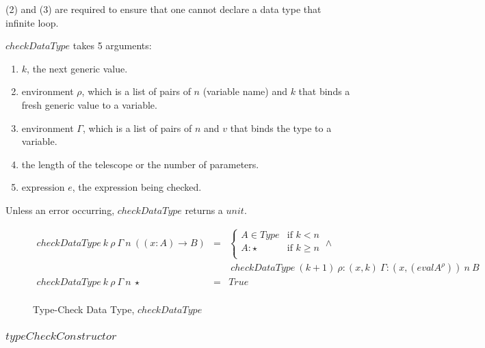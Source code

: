 \documentclass[acmsmall]{acmart}
\begin{document}
(2) and (3) are required to ensure that one cannot declare a data type that infinite loop.

$checkDataType$ takes 5 arguments:

\begin{enumerate}
  \item $k$, the next generic value.
  \item environment $\rho$, which is a list of pairs of $n$ (variable name) and $k$ that binds a fresh generic value to a variable.
  \item environment $\Gamma$, which is a list of pairs of $n$ and $v$ that binds the type to a variable.
  \item the length of the telescope or the number of parameters.
  \item expression $e$, the expression being checked.
\end{enumerate}

Unless an error occurring, $checkDataType$ returns a $unit$.

\begin{figure}[H]
  \begin{equation*}
    \begin{aligned}
      checkDataType \: k \: \rho \: \Gamma \: n \: ((x:A) \to B) & = & 
      \begin{cases}
        A \in Type & \text{if } k < n    \\ 
        A : \star  & \text{if } k \geq n \\                                                                  
      \end{cases}                                                                                                                                 \land \\
                                                                 &   & \: checkDataType \: (k+1) \: \rho : (x,k) \: \Gamma : (x, (eval A^{\rho})) \: n \: B            \\                                               
      checkDataType \: k \: \rho \: \Gamma \: n \: \star         & = & True                                                                                            \\
    \end{aligned}
  \end{equation*}
  \caption{Type-Check Data Type, $checkDataType$}
\end{figure}

\subsubsection{$typeCheckConstructor$}
\end{document}
